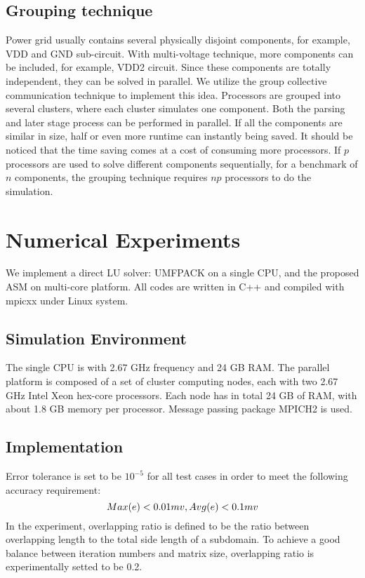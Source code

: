 \documentclass{sig-alternate}
\begin{document}
  \subsection{Grouping technique} 
	Power grid usually contains several physically disjoint components, for example, VDD and GND sub-circuit. With multi-voltage 
	technique, more components can be included, for example, VDD2 circuit. Since these components are totally independent, they can
	be solved in parallel. We utilize the group collective 
	communication technique to implement this idea. Processors are grouped into several clusters, where each cluster 
	simulates one component. Both the parsing and later stage process can be performed in parallel. 
	If all the components are similar in size, half or even more runtime can instantly being saved. 
	It should be noticed that the time saving comes at a cost of consuming more processors. If $p$ processors are used to 
	solve different components sequentially, for a benchmark of $n$ components, the grouping technique requires $np$ processors to
	do the simulation.  
\section{Numerical Experiments}
	We implement a direct LU solver: UMFPACK on a single CPU, and the proposed ASM on multi-core platform. 
	All codes are written in C++ and compiled with mpicxx under Linux system. 
  \subsection{Simulation Environment}
	The single CPU is with 2.67 GHz frequency and 24 GB RAM. The parallel platform is composed of a set of cluster 
	computing nodes, each with two 2.67 GHz Intel Xeon hex-core processors. Each node has in total 24 GB of RAM, with about 
	1.8 GB memory per processor. Message passing package MPICH2 is used.  
  \subsection{Implementation}
	Error tolerance is set to be $10^{-5}$ for all test cases in order to meet the following accuracy requirement:
	\begin{equation}
		Max(e) < 0.01 mv, Avg(e) < 0.1 mv\\ \label{eq_err}
	\end{equation}
	In the experiment, overlapping ratio is defined to be the ratio between overlapping length to the total side length of 
	a subdomain. To achieve a good balance between iteration numbers and matrix size, overlapping ratio is experimentally 
	setted to be 0.2.
			
\end{document}
